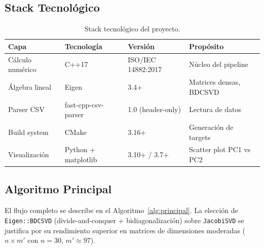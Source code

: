 \documentclass[12pt,a4paper]{article}
\theoremstyle{definition}
\begin{document}
\subsection{Stack Tecnol\'{o}gico}

\begin{table}[H]
\centering
\caption{Stack tecnol\'{o}gico del proyecto.}
\label{tab:stack}
\begin{tabular}{@{}llll@{}}
\toprule
\textbf{Capa} & \textbf{Tecnolog\'{i}a} & \textbf{Versi\'{o}n} & \textbf{Prop\'{o}sito} \\ \midrule
C\'{a}lculo num\'{e}rico & C++17 & ISO/IEC 14882:2017 & N\'{u}cleo del pipeline \\
\'{A}lgebra lineal & Eigen & 3.4+ & Matrices densas, BDCSVD \\
Parser CSV & fast-cpp-csv-parser & 1.0 (header-only) & Lectura de datos \\
Build system & CMake & 3.16+ & Generaci\'{o}n de targets \\
Visualizaci\'{o}n & Python + matplotlib & 3.10+ / 3.7+ & Scatter plot PC1 vs PC2 \\ \bottomrule
\end{tabular}
\end{table}

\subsection{Algoritmo Principal}

El flujo completo se describe en el Algoritmo~\ref{alg:principal}. La elecci\'{o}n de \texttt{Eigen::BDCSVD} (divide-and-conquer + bidiagonalizaci\'{o}n) sobre \texttt{JacobiSVD} se justifica por su rendimiento superior en matrices de dimensiones moderadas ($n \times m'$ con $n=30$, $m' \approx 97$).
\end{document}
